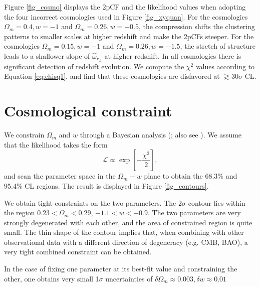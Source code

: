 \documentclass[iop]{emulateapj}
\providecommand{\DIFadd}[1]{{\protect\color{blue}\uwave{#1}}} %
\providecommand{\DIFaddbegin}{} %
\providecommand{\DIFaddend}{} %
\begin{document}


Figure \ref{fig_cosmo} displays the 2pCF and the likelihood values when adopting 
the four incorrect cosmologies used in Figure \ref{fig_xyquan}.
For the cosmologies $\Omega_m=0.4,w=-1$ and $\Omega_m=0.26,w=-0.5$,
the compression shifts the clustering patterns to smaller scales
at higher redshift and make the 2pCFs steeper.
For the cosmologies $\Omega_m=0.15,w=-1$ and $\Omega_m=0.26,w=-1.5$,
the stretch of structure leads to a shallower slope of $\hat{\omega}_{r_\perp}$ at higher redshift.
In all cosmologies there is significant detection of redshift evolution.
We compute the $\chi^2$ values according to Equation \ref{eq:chisq1}, 
and find that these cosmologies are disfavored 
at $\gtrsim30\sigma$ CL.






\section{Cosmological constraint}


We constrain $\Omega_m$ and $w$ through a Bayesian analysis (\cite{Bayesian}; also see \cite{LB2002,Li2016}).
We assume that the likelihood takes the form
\begin{equation}\label{eq:like}
 \mathcal{L} \propto \exp\left[-\frac{\chi^2}{2}\right],
\end{equation}
and scan the parameter space in the $\Omega_m-w$ plane to obtain the 68.3\% and 95.4\% CL regions.
The result is displayed in \DIFaddbegin \DIFadd{the left panel }\DIFaddend Figure \ref{fig_contours}.


We obtain tight constraints on the two parameters.
The 2$\sigma$ contour lies within the region $0.23<\Omega_m<0.29$, $-1.1<w<-0.9$.
The two parameters are very strongly degenerated with each other,
and the area of constrained region is quite small.
The thin shape of the contour implies that, 
when combining with other observational data with a different direction of degeneracy (e.g. CMB, BAO),
a very tight combined constraint can be obtained.

In the case of fixing one parameter at its best-fit value and constraining the other,
one obtains very small 1$\sigma$ uncertainties of $\delta\Omega_m\approx0.003,\delta w\approx0.01$\DIFaddbegin \DIFadd{.
}
\end{document}

